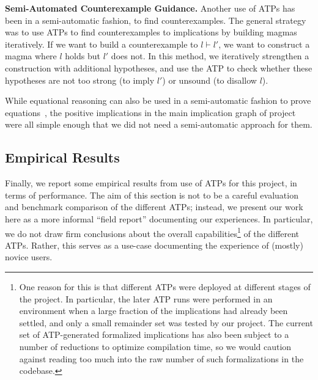 \textbf{Semi-Automated Counterexample Guidance.}  Another use of ATPs has been in a semi-automatic fashion, to find counterexamples.
The general strategy was to use ATPs to find counterexamples to implications by building magmas iteratively.
If we want to build a counterexample to $l \vdash l'$, we want to construct a magma where $l$ holds but $l'$ does not.
In this method, we iteratively strengthen a construction with additional hypotheses, and use the ATP to check whether these hypotheses are not too strong (to imply $l'$) or unsound (to disallow $l$).


While equational reasoning can also be used in a semi-automatic fashion to prove equations~\cite{DBLP:journals/pacmpl/KoehlerGBGTS24}, the positive implications in the main implication graph of project were all simple enough that we did not need a semi-automatic approach for them.



\subsection{Empirical Results}

Finally, we report some empirical results from use of ATPs for this project, in terms of performance.
The aim of this section is not to be a careful evaluation and benchmark comparison of the different ATPs; instead, we present our work here as a more informal ``field report'' documenting our experiences.
In particular, we do not draw firm conclusions about the overall capabilities\footnote{One reason for this is that different ATPs were deployed at different stages of the project.  In particular, the later ATP runs were performed in an environment when a large fraction of the implications had already been settled, and only a small remainder set was tested by our project.  The current set of ATP-generated formalized implications has also been subject to a number of reductions to optimize compilation time, so we would caution against reading too much into the raw number of such formalizations in the codebase.} of the different ATPs.
Rather, this serves as a use-case documenting the experience of (mostly) novice users.

